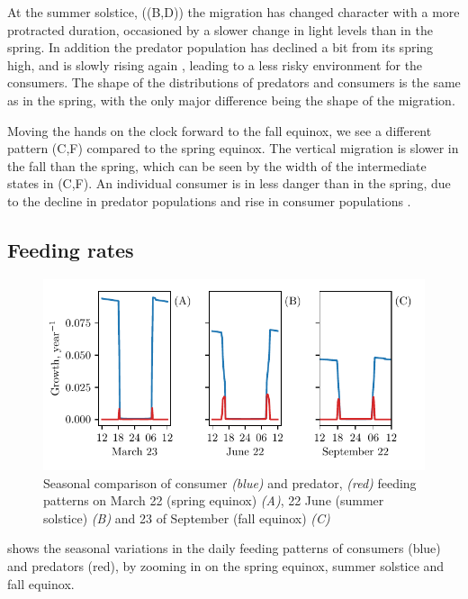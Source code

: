 At the summer solstice, ((B,D)) the migration has changed character with a more protracted duration, occasioned by a slower change in light levels than in the spring. In addition the predator population has declined a bit from its spring high, and is slowly rising again , leading to a less risky environment for the consumers. The shape of the distributions of predators and consumers is the same as in the spring, with the only major difference being the shape of the migration.

Moving the hands on the clock forward to the fall equinox, we see a different pattern (C,F) compared to the spring equinox. The vertical migration is slower in the fall than the spring, which can be seen by the width of the intermediate states in (C,F). An individual consumer is in less danger than in the spring, due to the decline in predator populations and rise in consumer populations .




\subsection{Feeding rates}
\begin{figure}[H]
\includegraphics{plots/growth_short_rational.pdf}
\caption{Seasonal comparison of consumer \emph{(blue)} and predator, \emph{(red)} feeding patterns on March 22 (spring equinox) \emph{(A)}, 22 June (summer solstice) \emph{(B)} and 23 of September (fall equinox) \emph{(C)}}
\label{fig:growth_short_rational}
\end{figure}
 shows the seasonal variations in the daily feeding patterns of consumers (blue) and predators (red), by zooming in on the spring equinox, summer solstice and fall equinox.

